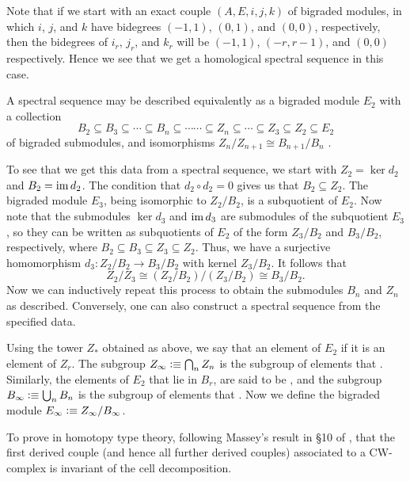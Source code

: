 \documentclass[reqno]{amsart}
\begin{document}
Note that if we start with an exact couple $(A,E,i,j,k)$ of bigraded modules, in which $i$, $j$, and $k$ have bidegrees $(-1,1)$, $(0,1)$, and $(0,0)$, respectively, then the bidegrees of $i_r$, $j_r$, and $k_r$ will be $(-1,1)$, $(-r,r-1)$, and $(0,0)$ respectively. Hence we see that we get a homological spectral sequence in this case.


A spectral sequence may be described equivalently as a bigraded module $E_2$
with a collection
\begin{equation*}
B_2\subseteq B_3 \subseteq \cdots \subseteq B_n \subseteq \cdots\cdots \subseteq Z_n \subseteq \cdots \subseteq Z_3 \subseteq Z_2 \subseteq E_2
\end{equation*} 
of bigraded submodules, and isomorphisms $Z_n/Z_{n+1}\cong B_{n+1}/B_n$ \cite{McCleary01}.

To see that we get this data from a spectral sequence, we start with 
$Z_2=\ker d_2$ and $B_2=\operatorname{im} d_2$. The condition that $d_2\circ d_2=0$ gives us 
that $B_2\subseteq Z_2$. 
The bigraded module $E_3$, being isomorphic to $Z_2/B_2$, is a subquotient of $E_2$.
Now note that the submodules $\ker d_3$ and $\operatorname{im} d_3$ are submodules of the 
subquotient $E_3$, so they can be written as subquotients of $E_2$ of the form 
$Z_3/B_2$ and $B_3/B_2$, respectively, 
where $B_2\subseteq B_3\subseteq Z_3\subseteq Z_2$. Thus, we have a surjective
homomorphism $d_3:
Z_2/B_2\to B_3/B_2$ with kernel $Z_3/B_2$. It follows that
\begin{equation*}
Z_2/Z_3\cong (Z_2/B_2)/(Z_3/B_2) \cong B_3/B_2.
\end{equation*}
Now we can inductively repeat this process to obtain the submodules $B_n$ and $Z_n$ as described.
Conversely, one can also construct a spectral sequence from the specified data.

Using the tower $Z_\ast$ obtained as above, we say that an element of $E_2$  if it is an element of $Z_r$. The subgroup $Z_\infty\vcentcolon\equiv\bigcap_n Z_n$
is the subgroup of elements that . 
Similarly, the elements of $E_2$ that
lie in $B_r$, are said to be , and the
subgroup $B_\infty\vcentcolon\equiv\bigcup_n B_n$ is the subgroup of elements that
. 
Now we define the bigraded module $E_\infty\vcentcolon\equiv Z_\infty/B_\infty$.

\begin{proposal}\label{p:derived_couple_invariance}
To prove in homotopy type theory, following Massey's result in \S 10 of \cite{Massey52}, 
that the first derived couple (and hence all further derived couples) associated to a CW-complex is invariant of the 
cell decomposition.
\end{proposal}
\end{document}
